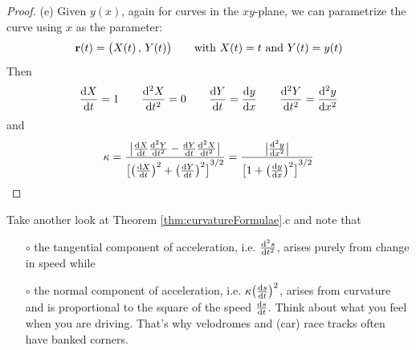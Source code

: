 \begin{proof}
\bigskip
\noindent (e)
Given $y(x)$, again for curves in the $xy$-plane,
we can parametrize the curve using $x$ as the parameter:
\begin{equation*}
\mathbf{r}(t) = \big(X(t)\,,\,Y(t)\big) \qquad\text{with $X(t)=t$ and $Y(t) =y(t)$}
\end{equation*}
Then
\begin{equation*}
\diff{X}{t} = 1 \qquad
\difftwo{X}{t} = 0 \qquad
\diff{Y}{t} = \diff{y}{x} \qquad
\difftwo{Y}{t} = \difftwo{y}{x}
\end{equation*}
and 
\begin{equation*}
\ka 
=\frac{\big|\diff{X}{t}\difftwo{Y}{t}-\diff{Y}{t}\difftwo{X}{t}\big|}
{ {\big[\big(\diff{X}{t}\big)^2+\big(\diff{Y}{t}\big)^2\big]}^{3/2} }
=\frac{\big|\difftwo{y}{x}\big|}
{ {\big[1+\big(\diff{y}{x}\big)^2\big]}^{3/2} }
\end{equation*}
\end{proof}

\noindent
Take another look at Theorem \ref{thm:curvatureFormulae}.c 
and note that
\begin{itemize}\itemsep1pt \parskip0pt  %
\item[$\circ$] 
the tangential component of acceleration, i.e. $\difftwo{s}{t}$,
arises purely from change in speed while
\item[$\circ$] 
the normal component of acceleration, i.e. $\ka\big(\diff{s}{t}\big)^2$,
arises from curvature and is proportional to the square of the speed
$\diff{s}{t}$. Think about what you feel when you are driving.
That's why velodromes and (car) race tracks often have banked corners.

\end{itemize}



